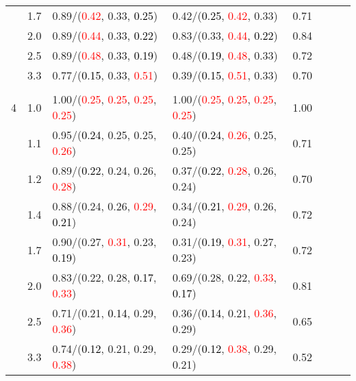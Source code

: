 \documentclass[10pt,a4paper]{report}
\begin{document}
\begin{table}[!htbp]
\begin{center}
{\begin{tabular}{ccllcccc}
			&1.7&0.89/(\textcolor{red}{0.42}, 0.33, \textcolor{black}{0.25})&0.42/(\textcolor{black}{0.25}, \textcolor{red}{0.42}, 0.33)&0.71\\
			&2.0&0.89/(\textcolor{red}{0.44}, 0.33, \textcolor{black}{0.22})&0.83/(0.33, \textcolor{red}{0.44}, \textcolor{black}{0.22})&0.84\\
			&2.5&0.89/(\textcolor{red}{0.48}, 0.33, \textcolor{black}{0.19})&0.48/(\textcolor{black}{0.19}, \textcolor{red}{0.48}, 0.33)&0.72\\
			&3.3&0.77/(\textcolor{black}{0.15}, 0.33, \textcolor{red}{0.51})&0.39/(\textcolor{black}{0.15}, \textcolor{red}{0.51}, 0.33)&0.70\\
			&&&&\\
			4			&1.0&1.00/(\textcolor{red}{0.25}, \textcolor{red}{0.25}, \textcolor{red}{0.25}, \textcolor{red}{0.25})&1.00/(\textcolor{red}{0.25}, \textcolor{red}{0.25}, \textcolor{red}{0.25}, \textcolor{red}{0.25})&1.00\\
			&1.1&0.95/(\textcolor{black}{0.24}, 0.25, 0.25, \textcolor{red}{0.26})&0.40/(\textcolor{black}{0.24}, \textcolor{red}{0.26}, 0.25, 0.25)&0.71\\
			&1.2&0.89/(\textcolor{black}{0.22}, 0.24, 0.26, \textcolor{red}{0.28})&0.37/(\textcolor{black}{0.22}, \textcolor{red}{0.28}, 0.26, 0.24)&0.70\\
			&1.4&0.88/(0.24, 0.26, \textcolor{red}{0.29}, \textcolor{black}{0.21})&0.34/(\textcolor{black}{0.21}, \textcolor{red}{0.29}, 0.26, 0.24)&0.72\\
			&1.7&0.90/(0.27, \textcolor{red}{0.31}, 0.23, \textcolor{black}{0.19})&0.31/(\textcolor{black}{0.19}, \textcolor{red}{0.31}, 0.27, 0.23)&0.72\\
			&2.0&0.83/(0.22, 0.28, \textcolor{black}{0.17}, \textcolor{red}{0.33})&0.69/(0.28, 0.22, \textcolor{red}{0.33}, \textcolor{black}{0.17})&0.81\\
			&2.5&0.71/(0.21, \textcolor{black}{0.14}, 0.29, \textcolor{red}{0.36})&0.36/(\textcolor{black}{0.14}, 0.21, \textcolor{red}{0.36}, 0.29)&0.65\\
			&3.3&0.74/(\textcolor{black}{0.12}, 0.21, 0.29, \textcolor{red}{0.38})&0.29/(\textcolor{black}{0.12}, \textcolor{red}{0.38}, 0.29, 0.21)&0.52\\
			\bottomrule
		\end{tabular}}
	\end{center}
\end{table}
\end{document}
